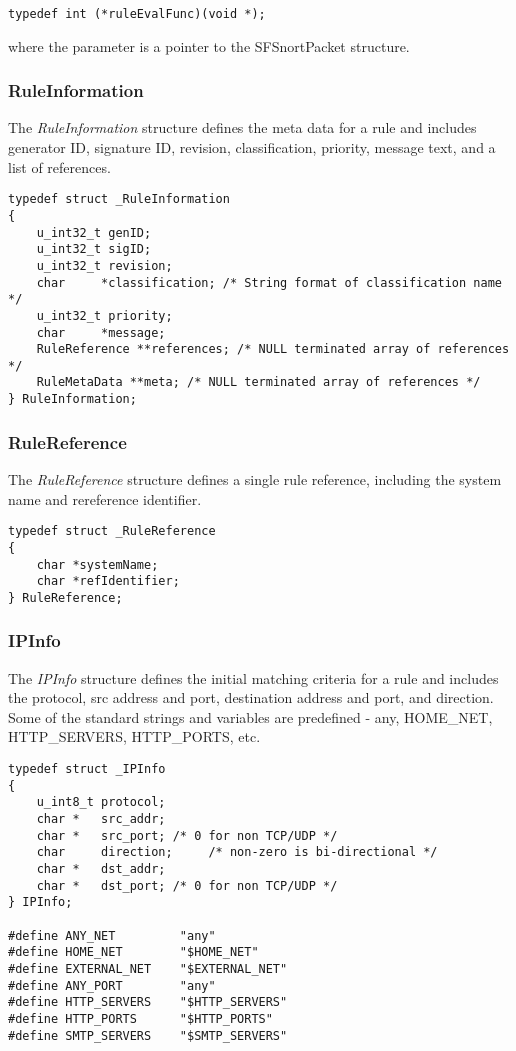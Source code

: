\documentclass[english]{report}
\begin{document}
\begin{verbatim}
typedef int (*ruleEvalFunc)(void *);
\end{verbatim}

where the parameter is a pointer to the SFSnortPacket structure.

\subsubsection{RuleInformation}

The {\em RuleInformation} structure defines the meta data for a rule and
includes generator ID, signature ID, revision, classification, priority,
message text, and a list of references.

\begin{verbatim}
typedef struct _RuleInformation
{
    u_int32_t genID;
    u_int32_t sigID;
    u_int32_t revision;
    char     *classification; /* String format of classification name */
    u_int32_t priority;
    char     *message;
    RuleReference **references; /* NULL terminated array of references */
    RuleMetaData **meta; /* NULL terminated array of references */
} RuleInformation;
\end{verbatim}

\subsubsection{RuleReference}

The {\em RuleReference} structure defines a single rule reference, including
the system name and rereference identifier.

\begin{verbatim}
typedef struct _RuleReference
{
    char *systemName;
    char *refIdentifier;
} RuleReference;
\end{verbatim}

\subsubsection{IPInfo}

The {\em IPInfo} structure defines the initial matching criteria for a rule and
includes the protocol, src address and port, destination address and port, and
direction.  Some of the standard strings and variables are predefined - any,
HOME\_NET, HTTP\_SERVERS, HTTP\_PORTS, etc.

\begin{verbatim}
typedef struct _IPInfo
{
    u_int8_t protocol;
    char *   src_addr;
    char *   src_port; /* 0 for non TCP/UDP */
    char     direction;     /* non-zero is bi-directional */
    char *   dst_addr;
    char *   dst_port; /* 0 for non TCP/UDP */
} IPInfo;

#define ANY_NET         "any"
#define HOME_NET        "$HOME_NET"
#define EXTERNAL_NET    "$EXTERNAL_NET"
#define ANY_PORT        "any"
#define HTTP_SERVERS    "$HTTP_SERVERS"
#define HTTP_PORTS      "$HTTP_PORTS"
#define SMTP_SERVERS    "$SMTP_SERVERS"
\end{verbatim}
\end{document}
